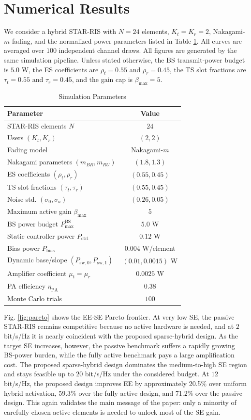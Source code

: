 \documentclass[journal]{IEEEtran}
\begin{document}
\section{Numerical Results}
We consider a hybrid STAR-RIS with $N=24$ elements, $K_t=K_r=2$, Nakagami-$m$ fading, and the normalized power parameters listed in Table \ref{tab:params}. All curves are averaged over $100$ independent channel draws. All figures are generated by the same simulation pipeline. Unless stated otherwise, the BS transmit-power budget is $5.0$ W, the ES coefficients are $\rho_t=0.55$ and $\rho_r=0.45$, the TS slot fractions are $\tau_t=0.55$ and $\tau_r=0.45$, and the gain cap is $\beta_{\max}=5$.

\begin{table}[t]
\caption{Simulation Parameters}
\label{tab:params}
\centering
\footnotesize
\begin{tabular}{lc}
\toprule
Parameter & Value \\
\midrule
STAR-RIS elements $N$ & $24$ \\
Users $(K_t,K_r)$ & $(2,2)$ \\
Fading model & Nakagami-$m$ \\
Nakagami parameters $(m_{BR},m_{RU})$ & $(1.8,1.3)$ \\
ES coefficients $(\rho_t,\rho_r)$ & $(0.55,0.45)$ \\ 
TS slot fractions $(\tau_t,\tau_r)$ & $(0.55,0.45)$ \\
Noise std. $(\sigma_0,\sigma_a)$ & $(0.26,0.05)$ \\
Maximum active gain $\beta_{\max}$ & $5$ \\
BS power budget $P_{\max}^{\mathrm{BS}}$ & $5.0$ W \\
Static controller power $P_{\mathrm{ctrl}}$ & $0.12$ W \\
Bias power $P_{\mathrm{bias}}$ & $0.004$ W/element \\
Dynamic base/slope $(P_{\mathrm{sw},0},P_{\mathrm{sw},1})$ & $(0.01,0.0015)$ W \\
Amplifier coefficient $\mu_t=\mu_r$ & $0.0025$ W \\
PA efficiency $\eta_{\mathrm{PA}}$ & $0.38$ \\
Monte Carlo trials & $100$ \\
\bottomrule
\end{tabular}
\end{table}

Fig. \ref{fig:pareto} shows the EE-SE Pareto frontier. At very low SE, the passive STAR-RIS remains competitive because no active hardware is needed, and at $2$ bit/s/Hz it is nearly coincident with the proposed sparse-hybrid design. As the target SE increases, however, the passive benchmark suffers a rapidly growing BS-power burden, while the fully active benchmark pays a large amplification cost. The proposed sparse-hybrid design dominates the medium-to-high SE region and stays feasible up to $20$ bit/s/Hz under the considered budget. At $12$ bit/s/Hz, the proposed design improves EE by approximately 20.5\% over uniform hybrid activation, 59.3\% over the fully active design, and 71.2\% over the passive design. This again validates the main message of the paper: only a minority of carefully chosen active elements is needed to unlock most of the SE gain.
\end{document}
